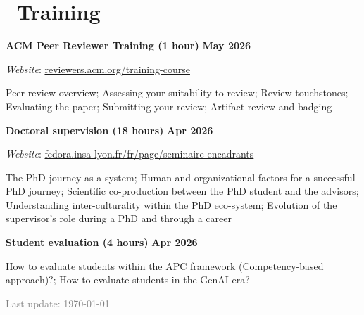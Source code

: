 \documentclass{article}
\begin{document}
\section*{\faWpforms\ Training}
\noindent\textbf{ACM Peer Reviewer Training (1 hour)} \hfill \textbf{May 2026}


\noindent\textit{Website}: \href{https://reviewers.acm.org/training-course}{reviewers.acm.org/training-course}


\noindent Peer-review overview; Assessing your suitability to review; Review touchstones; Evaluating the paper; Submitting your review; Artifact review and badging

\vspace{1em}\noindent\textbf{Doctoral supervision (18 hours)} \hfill \textbf{Apr 2026}


\noindent\textit{Website}: \href{https://fedora.insa-lyon.fr/fr/page/seminaire-encadrants}{fedora.insa-lyon.fr/fr/page/seminaire-encadrants}


\noindent The PhD journey as a system; Human and organizational factors for a successful PhD journey; Scientific co-production between the PhD student and the advisors; Understanding inter-culturality within the PhD eco-system; Evolution of the supervisor's role during a PhD and through a career

\vspace{1em}\noindent\textbf{Student evaluation (4 hours)} \hfill \textbf{Apr 2026}

\noindent How to evaluate students within the APC framework (Competency-based approach)?; How to evaluate students in the GenAI era?


\vspace{3em}\noindent\centering\textcolor{gray}{Last update: \today}
\end{document}
